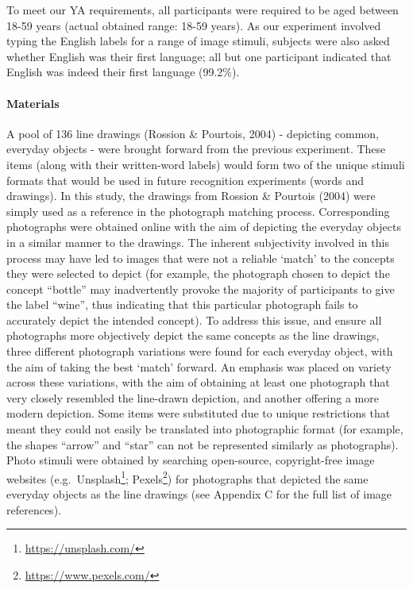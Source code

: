 \documentclass[
  11pt,
]{article}
\begin{document}
To meet our YA requirements, all participants were required to be aged
between 18-59 years (actual obtained range: 18-59 years). As our
experiment involved typing the English labels for a range of image
stimuli, subjects were also asked whether English was their first
language; all but one participant indicated that English was indeed
their first language (99.2\%).

\hypertarget{materials-1}{%
\paragraph{Materials}\label{materials-1}}

A pool of 136 line drawings (Rossion \& Pourtois, 2004) - depicting
common, everyday objects - were brought forward from the previous
experiment. These items (along with their written-word labels) would
form two of the unique stimuli formats that would be used in future
recognition experiments (words and drawings). In this study, the
drawings from Rossion \& Pourtois (2004) were simply used as a reference
in the photograph matching process. Corresponding photographs were
obtained online with the aim of depicting the everyday objects in a
similar manner to the drawings. The inherent subjectivity involved in
this process may have led to images that were not a reliable `match' to
the concepts they were selected to depict (for example, the photograph
chosen to depict the concept ``bottle'' may inadvertently provoke the
majority of participants to give the label ``wine'', thus indicating
that this particular photograph fails to accurately depict the intended
concept). To address this issue, and ensure all photographs more
objectively depict the same concepts as the line drawings, three
different photograph variations were found for each everyday object,
with the aim of taking the best `match' forward. An emphasis was placed
on variety across these variations, with the aim of obtaining at least
one photograph that very closely resembled the line-drawn depiction, and
another offering a more modern depiction. Some items were substituted
due to unique restrictions that meant they could not easily be
translated into photographic format (for example, the shapes ``arrow''
and ``star'' can not be represented similarly as photographs). Photo
stimuli were obtained by searching open-source, copyright-free image
websites (e.g.~Unsplash\footnote{\url{https://unsplash.com/}};
Pexels\footnote{\url{https://www.pexels.com/}}) for photographs that
depicted the same everyday objects as the line drawings (see Appendix C
for the full list of image references).
\end{document}
